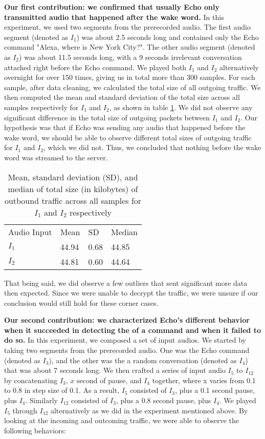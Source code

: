 \textbf{Our first contribution: we confirmed that usually Echo only transmitted audio that happened after the wake word.} In this experiment, we used two segments from the prerecorded audio. The first audio segment (denoted as $I_1$) was about 2.5 seconds long and contained only the Echo command "Alexa, where is New York City?". The other audio segment (denoted as $I_2$) was about 11.5 seconds long, with a 9 seconds irrelevant conversation attached right before the Echo command. We played both $I_1$ and $I_2$ alternatively overnight for over 150 times, giving us in total more than 300 samples. For each sample, after data cleaning, we calculated the total size of all outgoing traffic. We then computed the mean and standard deviation of the total size across all samples respectively for $I_1$ and $I_2$, as shown in table \ref{table1}. We did not observe any significant difference in the total size of outgoing packets between $I_1$ and $I_2$. Our hypothesis was that if Echo was sending any audio that happened before the wake word, we should be able to observe different total sizes of outgoing traffic for $I_1$ and $I_2$, which we did not. Thus, we concluded that nothing before the wake word was streamed to the server.

\begin{table}[ht]
\caption{Mean, standard deviation (SD), and median of total size (in kilobytes) of outbound traffic across all samples for $I_1$ and $I_2$ respectively}
\begin{tabular}{l|l|l|l}
Audio Input & Mean & SD & Median \\
$I_1$ & 44.94 & 0.68 & 44.85\\
$I_2$ & 44.81 & 0.60 & 44.64\\
\end{tabular}
\label{table1}
\end{table}

That being said, we did observe a few outliers that sent significant more data then expected. Since we were unable to decrypt the traffic, we were unsure if our conclusion would still hold for these corner cases.

\textbf{Our second contribution: we characterized Echo's different behavior when it succeeded in detecting the of a command and when it failed to do so.} In this experiment, we composed a set of input audios. We started by taking two segments from the prerecorded audio. One was the Echo command (denoted as $I_3$), and the other was the a random conversation (denoted as $I_4$) that was about 7 seconds long. We then crafted a series of input audio $I_5$ to $I_{12}$ by concatenating $I_3$, $x$ second of pause, and $I_4$ together, where x varies from 0.1 to 0.8 in step size of 0.1. As a result, $I_5$ consisted of $I_3$, plus a 0.1 second pause, plus $I_4$. Similarly $I_{12}$ consisted of $I_3$, plus a 0.8 second pause, plus $I_4$. We played $I_5$ through $I_{12}$ alternatively as we did in the experiment mentioned above. By looking at the incoming and outcoming traffic, we were able to observe the following behaviors: 

